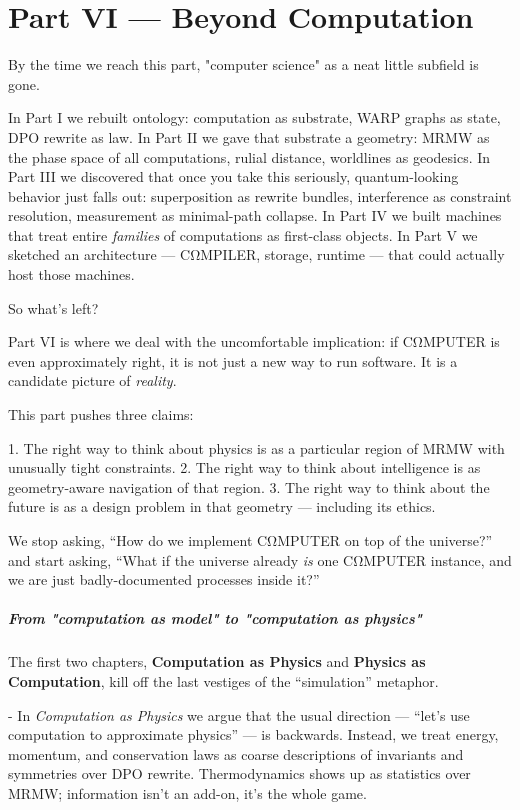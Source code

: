 \chapter*{Part VI --- Beyond Computation}

By the time we reach this part, "computer science" as a neat little subfield is gone.

In Part I we rebuilt ontology: computation as substrate, WARP graphs as state, DPO rewrite as law.  
In Part II we gave that substrate a geometry: MRMW as the phase space of all computations, rulial distance, worldlines as geodesics.  
In Part III we discovered that once you take this seriously, quantum-looking behavior just falls out: superposition as rewrite bundles, interference as constraint resolution, measurement as minimal-path collapse.  
In Part IV we built machines that treat entire \emph{families} of computations as first-class objects.  
In Part V we sketched an architecture — CΩMPILER, storage, runtime — that could actually host those machines.

So what’s left?

Part VI is where we deal with the uncomfortable implication:  
if CΩMPUTER is even approximately right, it is not just a new way to run software. It is a candidate picture of \emph{reality}.

This part pushes three claims:

1. The right way to think about physics is as a particular region of MRMW with unusually tight constraints.  
2. The right way to think about intelligence is as geometry-aware navigation of that region.  
3. The right way to think about the future is as a design problem in that geometry — including its ethics.

We stop asking, “How do we implement CΩMPUTER on top of the universe?” and start asking,  
“What if the universe already \emph{is} one CΩMPUTER instance, and we are just badly-documented processes inside it?”

\paragraph{From "computation as model" to "computation as physics"}

The first two chapters, \textbf{Computation as Physics} and \textbf{Physics as Computation}, kill off the last vestiges of the “simulation” metaphor.

- In \emph{Computation as Physics} we argue that the usual direction — “let’s use computation to approximate physics” — is backwards. Instead, we treat energy, momentum, and conservation laws as coarse descriptions of invariants and symmetries over DPO rewrite. Thermodynamics shows up as statistics over MRMW; information isn’t an add-on, it’s the whole game.

